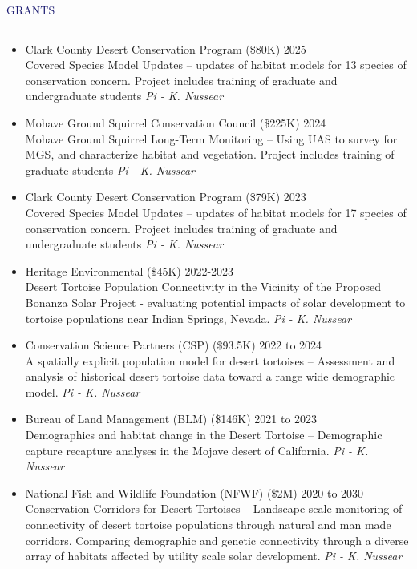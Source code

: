 \documentclass{resume} %
\renewenvironment{rSection}[1]{
\sectionskip
\textcolor{MidnightBlue}{\MakeUppercase{#1}}
\sectionlineskip
\hrule
\begin{list}{}{
\setlength{\leftmargin}{1.5em}
}
\item[]
}{
\end{list}
}
\begin{document}
\begin{rSection}{Grants}{}
\begin{itemize}
\item Clark County Desert Conservation Program (\$80K) \hfill 2025\\
Covered Species Model Updates -- updates of habitat models for 13 species of conservation concern. Project includes training of graduate and undergraduate students
\textit{Pi - K. Nussear}
\item Mohave Ground Squirrel Conservation Council (\$225K) \hfill 2024\\
Mohave Ground Squirrel Long-Term Monitoring -- Using UAS to survey for MGS, and characterize habitat and vegetation. Project includes training of graduate students
\textit{Pi - K. Nussear}
\item Clark County Desert Conservation Program (\$79K) \hfill 2023\\
Covered Species Model Updates -- updates of habitat models for 17 species of conservation concern. Project includes training of graduate and undergraduate students
\textit{Pi - K. Nussear}
\item Heritage Environmental (\$45K) \hfill 2022-2023\\
Desert Tortoise Population Connectivity in the Vicinity of the Proposed Bonanza Solar Project - evaluating potential impacts of solar development to tortoise populations near Indian Springs, Nevada.
\textit{Pi - K. Nussear}

\item Conservation Science Partners (CSP) (\$93.5K) \hfill 2022 to 2024 \\
A spatially explicit population model for desert tortoises -- Assessment and analysis of historical desert tortoise data toward a range wide demographic model.
\textit{Pi - K. Nussear}

\item Bureau of Land Management (BLM) (\$146K) \hfill 2021 to 2023 \\
Demographics and habitat change in the Desert Tortoise -- Demographic capture recapture analyses in the Mojave desert of California.
\textit{Pi - K. Nussear}

\item National Fish and Wildlife Foundation (NFWF) (\$2M) \hfill 2020 to 2030 \\
Conservation Corridors for Desert Tortoises -- Landscape scale monitoring of connectivity of desert tortoise populations through natural and man made corridors. Comparing demographic and genetic connectivity through a diverse array of habitats affected by utility scale solar development. \textit{Pi - K. Nussear}


\end{itemize}
\end{rSection}
\end{document}
